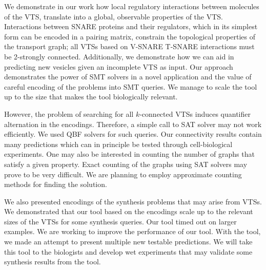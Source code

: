 \noindent 
We demonstrate in our work how local regulatory interactions between molecules of the VTS, translate
into a global, observable properties of the VTS. 
%
Interactions between SNARE proteins and their
regulators, which in its simplest form can be encoded in a pairing matrix, constrain the topological
properties of the transport graph; all VTSs based on V-SNARE T-SNARE interactions must be 2-strongly connected.
% 
Additionally, we demonstrate how we can aid in predicting new vesicles given an incomplete VTS as input. 
%
Our approach demonstrates the power of SMT solvers in a novel application and the value of careful encoding of the problems into SMT queries. 
%
We manage to scale the tool up
to the size that makes the tool biologically relevant.
%

However, the problem of searching for all $k$-connected VTSs induces quantifier alternation in the encodings.
%
Therefore, a simple call to SAT solver may not work efficiently. 
%
We used QBF solvers for such queries.
%
Our connectivity results contain many predictions which can in principle be tested through cell-biological experiments. 
%
One may also be interested in counting the number of graphs that satisfy
a given property. 
%
Exact counting of the graphs using SAT solvers may prove to be very
difficult. 
%
We are planning to employ approximate counting methods for finding the solution.
%

We also presented encodings of the synthesis problems that may arise from VTSs.
%
We demonstrated that our tool based on the encodings
scale up to the relevant sizes of the VTSs for some synthesis queries.
%
Our tool timed out on larger examples.
%
We are working to improve the performance of our tool.
%
%
With the tool, we made an attempt to present multiple new testable predictions. 
%
We will take this tool to the biologists and develop wet experiments that may
validate some synthesis results from the tool.
%
%

